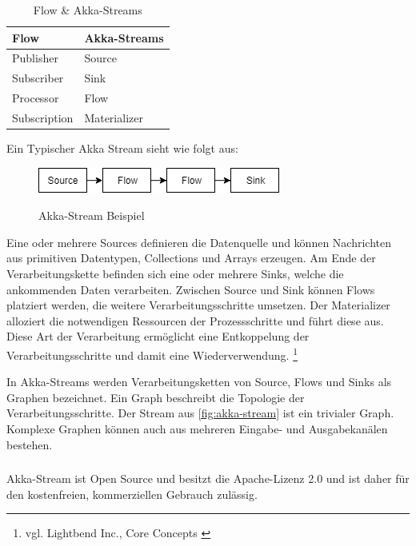 \begin{table}[H]
\caption{Flow \& Akka-Streams}
\centering
\begin{tabular}{|l|l|}
\hline
\rowcolor[HTML]{00A99D} 
Flow         & Akka-Streams \\ \hline
Publisher    & Source       \\ \hline
Subscriber   & Sink         \\ \hline
Processor    & Flow         \\ \hline
Subscription & Materializer \\ \hline
\end{tabular}
\label{flow_to_akka}
\end{table}
\clearpage
Ein Typischer Akka Stream sieht wie folgt aus:

\begin{center}
\begin{figure}[H]
\centering
\caption{Akka-Stream Beispiel}
\includegraphics[width=.75\textwidth]{media/akka-stream}
\label{fig:akka-stream}
\end{figure}
\end{center}

Eine oder mehrere Sources definieren die Datenquelle und können Nachrichten aus primitiven Datentypen, Collections und Arrays erzeugen. Am Ende der Verarbeitungskette befinden sich eine oder mehrere Sinks, welche die ankommenden Daten verarbeiten. Zwischen Source und Sink können Flows platziert werden, die weitere Verarbeitungsschritte umsetzen. Der Materializer alloziert die notwendigen Ressourcen der Prozessschritte und führt diese aus. Diese Art der Verarbeitung ermöglicht eine Entkoppelung der Verarbeitungsschritte und damit eine Wiederverwendung. \footnote{vgl. Lightbend Inc., Core Concepts \cite{web:akka:docs:streams_flows_and_basics}\label{akka:concept}}

In Akka-Streams werden Verarbeitungsketten von Source, Flows und Sinks als Graphen bezeichnet. Ein Graph beschreibt die Topologie der Verarbeitungsschritte. Der Stream aus \autoref{fig:akka-stream} ist ein trivialer Graph. Komplexe Graphen können auch aus mehreren Eingabe- und Ausgabekanälen bestehen. 

\subsubsection{\criteriaLizenz}
Akka-Stream ist Open Source und besitzt die Apache-Lizenz 2.0 und ist daher für den kostenfreien, kommerziellen
Gebrauch zulässig.


